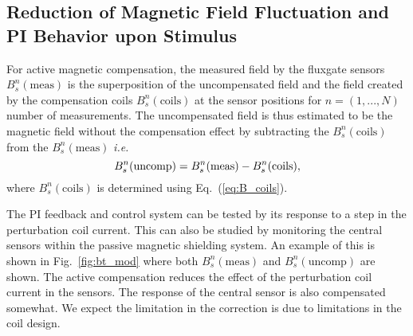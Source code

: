\subsection{Reduction of Magnetic Field Fluctuation and PI Behavior upon Stimulus}


For active magnetic compensation, the measured field by the fluxgate sensors $B_s^n(\text{meas})$ is the superposition of the uncompensated field and the field created by the compensation coils $B_s^n(\text{coils})$ at the sensor positions for $n=(1,...,N)$ number of measurements. The uncompensated field is thus estimated to be the magnetic field without the compensation effect by subtracting the $B_s^n(\text{coils})$ from the $B_s^n(\text{meas})$ {\it i.e.}
\begin{equation}\label{eq:Buncomp}
     B_s^n(\text{uncomp})=B_s^n(\text{meas})- B_s^n(\text{coils}){\rm ,}
\end{equation}
where $B_s^n(\text{coils})$ is determined using Eq.~(\ref{eq:B_coils}).




The PI feedback and control system can be tested by its response to a step in the perturbation coil current. This can also be studied by monitoring the central sensors within the passive magnetic shielding system. An example of this is shown in Fig.~\ref{fig:bt_mod} where both $B_s^n(\text{meas})$ and $B_s^n(\text{uncomp})$ are shown.  The active compensation reduces the effect of the perturbation coil current in the sensors. The response of the central sensor is also compensated somewhat. We expect the limitation in the correction is due to limitations in the coil design. 


